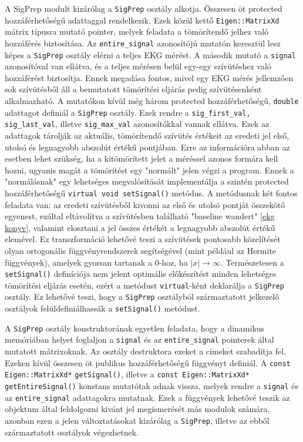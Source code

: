 \documentclass[oneside,titlepage,12pt,a4paper]{report}
\begin{document}
\par A SigPrep modult kizárólag a \texttt{SigPrep} osztály alkotja. Összesen öt protected hozzáférhetőségű adattaggal rendelkezik. Ezek közül kettő \texttt{Eigen::MatrixXd} mátrix típusra mutató pointer, melyek feladata a tömörítendő jelhez való hozzáférés biztosítása. Az \texttt{entire\_signal} azonosítójú mutatón keresztül lesz képes a \texttt{SigPrep} osztály elérni a teljes EKG mérést. A második mutató a \texttt{signal} azonosítóval van ellátva, és a teljes mérésen belül egy-egy szívütéshez való hozzáférést biztosítja. Ennek megadása fontos, mivel egy EKG mérés jellemzően sok szívütésből áll a bemutatott tömörítési eljárás pedig szívütésenként alkalmazható. A mutatókon kívül még három protected hozzáférhetőségű, \texttt{double} adattagot definiál a \texttt{SigPrep} osztály. Ezek rendre a \texttt{sig\_first\_val, sig\_last\_val}, illetve \texttt{sig\_max\_val} azonosítókkal vannak ellátva. Ezek az adattagok tárolják az aktuális, tömörítendő szívütés értékeit az eredeti jel első, utolsó és legnagyobb abszolút értékű pontjában. Erre az információra abban az esetben lehet szükség, ha a kitömörített jelet a méréssel azonos formára kell hozni, ugyanis magát a tömörítést egy "normált" jelen végzi a program. Ennek a "normálásnak" egy lehetséges megvalósítását implementálja a szintén protected hozzáférhetőségű \texttt{virtual void setSignal()} metódus. A metódusnak két fontos feladata van: az eredeti szívütésből kivonni az első és utolsó pontját összekötő egyenest, ezáltal eltávolítva a szívütésben található "baseline wandert" \ref{ekg konyv}, valamint elosztani a jel összes értékét a legnagyobb abszolút értékű elemével. Ez transzformáció lehetővé teszi a szívütések pontosabb közelítését olyan ortogonális függvényrendszerek segítségével (mint például az Hermite függvények), amelyek gyorsan tartanak a 0-hoz, ha $|x| \to \infty$. Természetesen a \texttt{setSignal()} definíciója nem jelent optimális előkészítést minden lehetséges tömörítési eljárás esetén, ezért a metódust \texttt{virtual}-ként deklarálja a \texttt{SigPrep} osztály. Ez lehetővé teszi, hogy a \texttt{SigPrep} osztályból származtatott jelkezelő osztályok felüldefiniálhassák a \texttt{setSignal()} metódust. 
\par A \texttt{SigPrep} osztály konstruktorának egyetlen feladata, hogy a dinamikus memóriában helyet foglaljon a \texttt{signal} és az \texttt{entire\_signal} pointerek által mutatott mátrixoknak. Az osztály destruktora ezeket a címeket szabadítja fel.  Ezeken kívül összesen öt publikus hozzáférhetőségű függvényt definiál. \linebreak A \texttt{const Eigen::MatrixXd*} \texttt{getSignal()}, illetve a \texttt{const Eigen::MatrixXd*} \linebreak \texttt{getEntireSignal()} konstans mutatótak adnak vissza, melyek rendre a \texttt{signal} és az \texttt{entire\_signal} adattagokra mutatnak. Ezek a függvények lehetővé teszik az objektum által feldolgozni kívánt jel megismerését más modulok számára, azonban ezen a jelen változtatásokat kizárólag a \texttt{SigPrep}, illetve az ebből származtatott osztályok végezhetnek.
\end{document}

